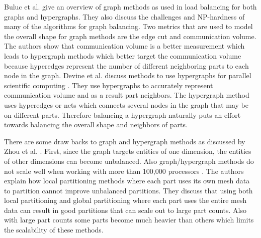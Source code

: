 \documentclass{thesis}
\begin{document}
Buluc et al. \cite{surveygraph} give an overview of graph methods as used in 
load balancing 
for both graphs and hypergraphs. They also discuss the challenges and 
NP-hardness of many of the algorithms for graph balancing. Two metrics that 
are used to model the overall shape for graph methods are the edge cut and 
communication volume. The authors show that communication volume is a better 
measurement which leads to hypergraph methods which better target the 
communication volume because hyperedges represent the number of different 
neighboring parts to each node in the graph. Devine et al. discuss methods 
to use hypergraphs for parallel scientific computing \cite{hypergraph}. They
use hypergraphs to accurately represent communication volume and as a result
part neighbors. The hypergraph method uses hyperedges or nets which connects 
several nodes in the graph that may be on different parts. Therefore 
balancing a hypergraph naturally puts an effort towards balancing the overall
shape and neighbors of parts. 

There are some draw backs to graph and hypergraph methods as discussed 
by Zhou et al. \cite{zhougraph}. First, since the graph targets 
entities of one dimension, the entities of other dimensions can become 
unbalanced. Also graph/hypergraph methods do not scale well when working with 
more than 100,000 processors \cite{zhougraph}. The authors explain how 
local partitioning methods where each part uses its own mesh data to 
partition cannot improve unbalanced partitions. They discuss that using 
both local partitioning and global partitioning where each part uses the 
entire mesh data can result in good partitions that can scale out to large 
part counts. Also with large part counts some parts become much heavier than 
others which limits the scalability of these methods.
\end{document}
